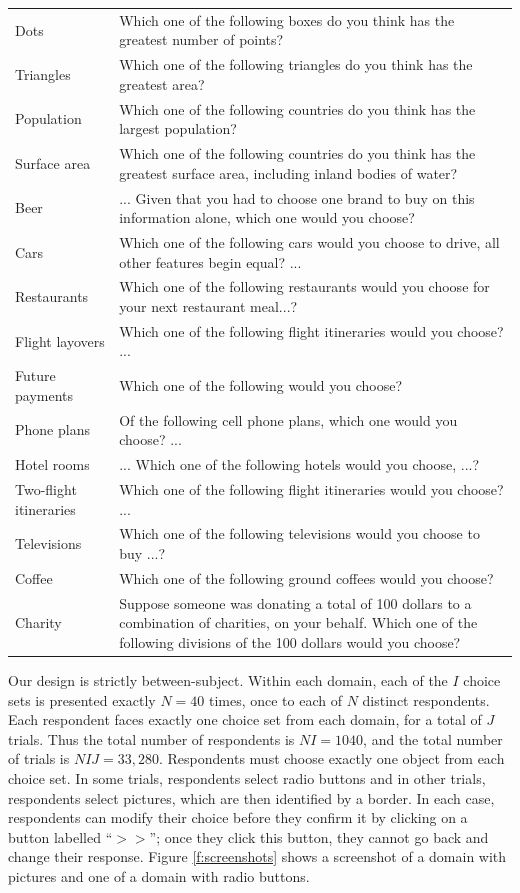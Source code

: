 \documentclass[11pt,letter]{article}
\begin{document}
\begin{table}[h!]
\begin{center}
\begin{small}
\begin{tabular}{lp{12cm}}
		Dots & Which one of the following boxes do you think has the greatest number of points? \\
		Triangles & Which one of the following triangles do you think has the greatest area? \\
		Population & Which one of the following countries do you think has the largest population? \\
		Surface area & Which one of the following countries do you think has the greatest surface area, including inland bodies of water? \\
		Beer & ... Given that you had to choose one brand to buy on this information alone, which one would you choose? \\
		Cars & Which one of the following cars would you choose to drive, all other features
begin equal? ... \\
		Restaurants & Which one of the following restaurants would you choose for your next restaurant meal...? \\
		Flight layovers & Which one of the following flight itineraries would you choose? ... \\
		Future payments & Which one of the following would you choose? \\
		Phone plans & Of the following cell phone plans, which one would you choose? ... \\
		Hotel rooms & ... Which one of the following hotels would you choose, ...? \\
		Two-flight itineraries & Which one of the following flight itineraries would you choose? ... \\
		Televisions & Which one of the following televisions would you choose to buy ...? \\
		Coffee & Which one of the following ground coffees would you choose? \\
		Charity & Suppose someone was donating a total of 100 dollars to a combination of charities,
on your behalf.
Which one of the following divisions of the 100 dollars would you choose? \\
    \end{tabular}
    \end{small}
  \end{center}
\end{table}

Our design is strictly between-subject.
Within each domain, each of the $I$ choice sets is presented exactly $N=40$ times, once to each of $N$ distinct respondents.
Each respondent faces exactly one choice set from each domain, for a total of $J$ trials.
Thus the total number of respondents is $NI=1040$, and the total number of trials is $NIJ=33,280$.
Respondents must choose exactly one object from each choice set.
In some trials, respondents select radio buttons and in other trials, respondents select pictures, which are then identified by a border.
In each case, respondents can modify their choice before they confirm it by clicking on a button labelled ``$>>$''; once they click this button, they cannot go back and change their response.
Figure \ref{f:screenshots} shows a screenshot of a domain with pictures and one of a domain with radio buttons.
\end{document}

